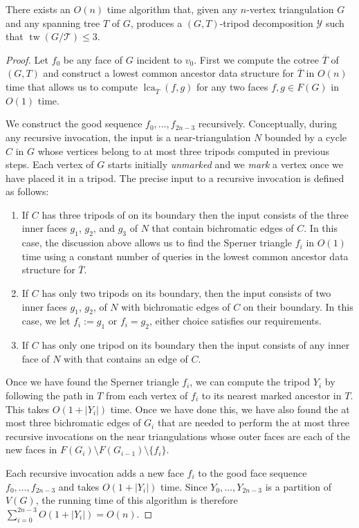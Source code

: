 \documentclass{patmorin}
\DeclareMathOperator{\tw}{tw}
\DeclareMathOperator{\lca}{lca}
\begin{document}
\begin{thm}
  There exists an $O(n)$ time algorithm that, given any $n$-vertex triangulation $G$ and any spanning tree $T$ of $G$, produces a $(G,T)$-tripod decomposition $\mathcal{Y}$ such that $\tw(G/\mathcal{T})\le 3$.
\end{thm}

\begin{proof}
  Let $f_0$ be any face of $G$ incident to $v_0$.  First we compute the cotree $\overline{T}$ of $(G,T)$ and construct  a lowest common ancestor data structure for $\overline{T}$ in $O(n)$ time that allows us to compute $\lca_{\overline{T}}(f,g)$ for any two faces $f,g\in F(G)$ in $O(1)$ time.

  We construct the good sequence $f_0,\ldots,f_{2n-3}$ recursively. Conceptually, during any recursive invocation, the input is a near-triangulation $N$ bounded by a cycle $C$ in $G$ whose vertices belong to at most three tripods computed in previous steps.  Each vertex of $G$ starts initially \emph{unmarked} and we \emph{mark} a vertex once we have placed it in a tripod.  The precise input to a recursive invocation is defined as follows:
  \begin{enumerate}
    \item If $C$ has three tripods of on its boundary then the input consists of the three inner faces $g_1$, $g_2$, and $g_3$ of $N$ that contain bichromatic edges of $C$. In this case, the discussion above allows us to find the Sperner triangle $f_i$ in $O(1)$ time using a constant number of queries in the lowest common ancestor data structure for $\overline{T}$.

    \item If $C$ has only two tripods on its boundary, then the input consists of two inner faces $g_1$, $g_2$, of $N$ with bichromatic edges of $C$ on their boundary.  In this case, we let $f_i:=g_1$ or $f_i=g_2$, either choice satisfies our requirements.

    \item If $C$ has only one tripod on its boundary then the input consists of any inner face of $N$ with that contains an edge of $C$.
\end{enumerate}
Once we have found the Sperner triangle $f_i$, we can compute the tripod $Y_i$ by following the path in $T$ from each vertex of $f_i$ to its nearest marked ancestor in $T$.  This takes $O(1+|Y_i|)$ time.  Once we have done this, we have also found the at most three bichromatic edges of $G_i$ that are needed to perform the at most three recursive invocations on the near triangulations whose outer faces are each of the new faces in $F(G_i)\setminus F(G_{i-1})\setminus\{f_i\}$.

Each recursive invocation adds a new face $f_i$ to the good face sequence $f_0,\ldots,f_{2n-3}$ and takes $O(1+|Y_i|)$ time.  Since $Y_0,\ldots,Y_{2n-3}$ is a partition of $V(G)$, the running time of this algorithm is therefore $\sum_{i=0}^{2n-3} O(1+|Y_i|) = O(n)$.
\end{proof}
\end{document}

